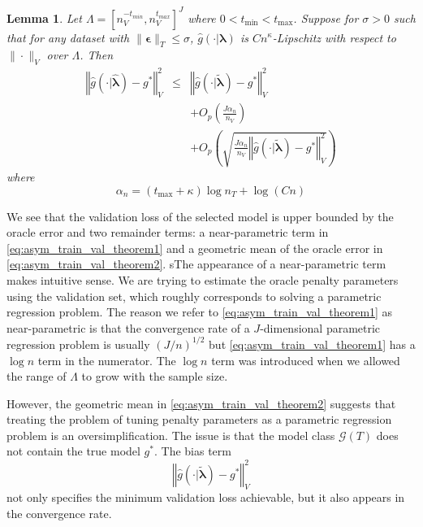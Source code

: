 \documentclass[12pt]{article}
\newtheorem{lemma}{Lemma}
\begin{document}
\begin{lemma}
	\label{lemma:train_val_special}
	Let $\Lambda=[n_{V}^{-t_{min}},n_{V}^{t_{max}}]^{J}$ where $0 < t_{\min} < t_{\max}$. Suppose for $\sigma >0$ such that for any dataset with $\|\boldsymbol{\epsilon}\|_T \le \sigma$, $\hat g (\cdot |\boldsymbol{\lambda} )$ is $C  n^{\kappa}$-Lipschitz with respect to $\| \cdot \|_V$ over $\Lambda$.
	Then
	\begin{eqnarray}
	\left\Vert \hat{g}(\cdot|\hat{\boldsymbol{\lambda}})-g^{*}\right\Vert _{V}^2 &\le& \left\Vert \hat{g}(\cdot|\tilde{\boldsymbol{\lambda}})-g^{*}\right\Vert^2_{V}\\
	&& + O_p \left(\frac{J\alpha_n}{n_{V}}\right) \label{eq:asym_train_val_theorem1} \\
	&& + O_p \left(
	\sqrt{\frac{J\alpha_n}{n_{V}}	
	 \left\Vert \hat{g}(\cdot|\tilde{\boldsymbol{\lambda}})-g^{*}\right\Vert _{V}^2
	}
	 \right )
	  \label{eq:asym_train_val_theorem2}
	\end{eqnarray}
	where
	$$
	\alpha_n = \left(t_{\max}+\kappa\right)\log n_T + \log (Cn)
	$$
\end{lemma}
We see that the validation loss of the selected model is upper bounded by the oracle error and two remainder terms: a near-parametric term in \eqref{eq:asym_train_val_theorem1} and a geometric mean of the oracle error in \eqref{eq:asym_train_val_theorem2}. sThe appearance of a near-parametric term makes intuitive sense. We are trying to estimate the oracle penalty parameters using the validation set, which roughly corresponds to solving a parametric regression problem. The reason we refer to \eqref{eq:asym_train_val_theorem1} as near-parametric is that the convergence rate of a $J$-dimensional parametric regression problem is usually $(J/n)^{1/2}$ but \eqref{eq:asym_train_val_theorem1} has a $\log n$ term in the numerator. The $\log n$ term was introduced when we allowed the range of $\Lambda$ to grow with the sample size.

However, the geometric mean in \eqref{eq:asym_train_val_theorem2} suggests that treating the problem of tuning penalty parameters as a parametric regression problem is an oversimplification. The issue is that the model class $\mathcal{G}(T)$ does not contain the true model $g^*$. The bias term 
\begin{equation}
\left\Vert \hat{g}(\cdot|\tilde{\boldsymbol{\lambda}})-g^{*}\right\Vert^2_{V}
\end{equation}
not only specifies the minimum validation loss achievable, but it also appears in the convergence rate.
\end{document}
